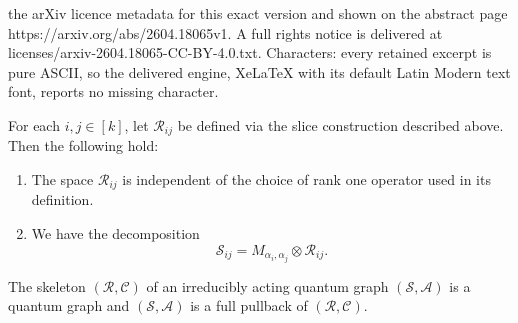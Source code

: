\documentclass[10pt,a4paper]{amsart}
\newcommand{\A}{{\mathcal{A}}}
\newcommand{\C}{{\mathcal{C}}}
\newcommand{\R}{{\mathcal{R}}}
\renewcommand{\S}{{\mathcal{S}}}
\begin{document}
the arXiv licence metadata for this exact version and shown on the abstract page https://arxiv.org/abs/2604.18065v1. A full rights notice is delivered at licenses/arxiv-2604.18065-CC-BY-4.0.txt. Characters: every retained excerpt is pure ASCII, so the delivered engine, XeLaTeX with its default Latin Modern text font, reports no missing character.
\begin{lemma}\label{lem:rij_structure}
For each $i,j\in [k]$, let $\R_{ij}$ be defined via the slice construction described above. Then the following hold:
\begin{enumerate}
\item The space $\R_{ij}$ is independent of the choice of rank one operator used in its definition.
\item We have the decomposition
\[
\S_{ij}
=
M_{\alpha_i,\alpha_j}\otimes \R_{ij}.
\]
\end{enumerate}
\end{lemma}

\begin{proposition}\label{prop:reduced_qgraph}
The skeleton $(\R,\C)$ of an irreducibly acting quantum graph $(\S,\A)$ is a quantum graph and $(\S,\A)$ is a full pullback of $(\R,\C)$.
\end{proposition}
\end{document}

